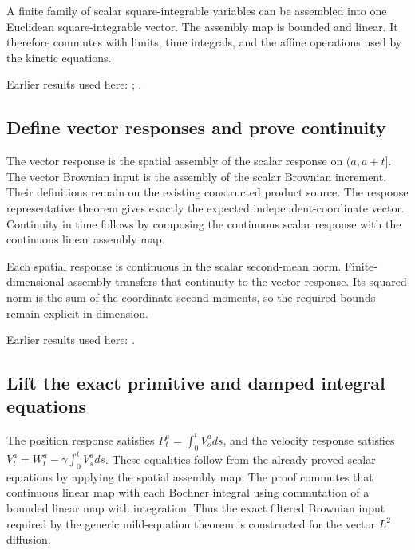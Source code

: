 \documentclass[11pt,a4paper]{report}
\begin{document}
A finite family of scalar square-integrable variables can be assembled into one Euclidean square-integrable vector. The assembly map is bounded and linear. It therefore commutes with limits, time integrals, and the affine operations used by the kinetic equations.



Earlier results used here: \cite[Section~3.8.16]{LangevinLean2026ULASC}; \cite[Section~3.8.17]{LangevinLean2026ULASC}.
\subsection{\texorpdfstring{Define vector responses and prove continuity}{Define vector responses and prove continuity}}
\label{report-step-KineticLangevin-VectorSegmentEquations-lean-2}


The vector response is the spatial assembly of the scalar response on \((a,a+t]\). The vector Brownian input is the assembly of the scalar Brownian increment. Their definitions remain on the existing constructed product source. The response representative theorem gives exactly the expected independent-coordinate vector. Continuity in time follows by composing the continuous scalar response with the continuous linear assembly map.



Each spatial response is continuous in the scalar second-mean norm. Finite-dimensional assembly transfers that continuity to the vector response. Its squared norm is the sum of the coordinate second moments, so the required bounds remain explicit in dimension.



Earlier results used here: \cite[Section~3.8.17]{LangevinLean2026ULASC}.
\subsection{\texorpdfstring{Lift the exact primitive and damped integral equations}{Lift the exact primitive and damped integral equations}}
\label{report-step-KineticLangevin-VectorSegmentEquations-lean-3}


The position response satisfies \(P^a_t=\int_0^tV^a_sds\), and the velocity response satisfies \(V^a_t=W^a_t-\gamma\int_0^tV^a_sds\). These equalities follow from the already proved scalar equations by applying the spatial assembly map. The proof commutes that continuous linear map with each Bochner integral using commutation of a bounded linear map with integration. Thus the exact filtered Brownian input required by the generic mild-equation theorem is constructed for the vector \(L^{2}\) diffusion.
\end{document}
